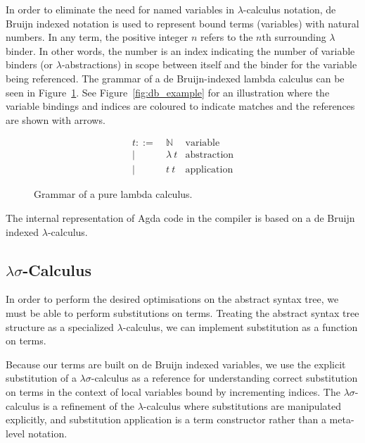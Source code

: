 In order to eliminate the need for named variables in $\lambda$-calculus notation, de Bruijn indexed notation is used to represent bound terms (variables) with natural numbers. In any term, the positive integer $n$ refers to the $n$th surrounding $\lambda$ binder.\cite{deBruijn-1972} In other words, the number is an index indicating the number of variable binders (or $\lambda$-abstractions) in scope between itself and the binder for the variable being referenced. The grammar of a de Bruijn-indexed lambda calculus can be seen in Figure~\ref{fig:db_lambda_calc}. See Figure~\ref{fig:db_example} for an illustration where the variable bindings and indices are coloured to indicate matches and the references are shown with arrows.



\begin{figure}[h]
\begin{align*}
t ::=~& \mathbb{N}      & \text{variable}\\
    |~& \lambda~t       & \text{abstraction}\\
    |~& t~t             & \text{application}
\end{align*}
\caption{Grammar of a pure lambda calculus.}
\label{fig:db_lambda_calc}
\end{figure}

The internal representation of Agda code in the compiler is based on a de Bruijn indexed $\lambda$-calculus.

\subsection{$\lambda\sigma$-Calculus}

In order to perform the desired optimisations on the abstract syntax tree, we must be able to perform substitutions on terms. Treating the abstract syntax tree structure as a specialized $\lambda$-calculus, we can implement substitution as a function on terms.

Because our terms are built on de Bruijn indexed variables, we use the explicit substitution of a $\lambda\sigma$-calculus as a reference for understanding correct substitution on terms in the context of local variables bound by incrementing indices. The $\lambda\sigma$-calculus is a refinement of the $\lambda$-calculus where substitutions are manipulated explicitly, and substitution application is a term constructor rather than a meta-level notation.\cite{Abadi-Cardelli-Curien-Levy-1990}


